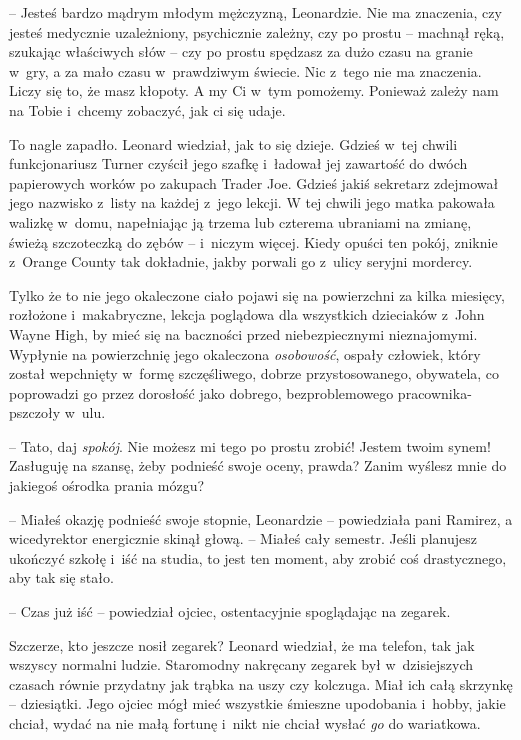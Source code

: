 \documentclass[oneside,polish,11pt,rmheadings]{mwbk}
\begin{document}
-- Jesteś bardzo mądrym młodym mężczyzną, Leonardzie. Nie ma znaczenia, czy jesteś medycznie uzależniony, psychicznie zależny, czy po prostu -- machnął ręką, szukając właściwych słów -- czy po prostu spędzasz za dużo czasu na granie w~gry, a za mało czasu w~prawdziwym świecie. Nic z~tego nie ma znaczenia. Liczy się to, że masz kłopoty. A my Ci w~tym pomożemy. Ponieważ zależy nam na Tobie i~chcemy zobaczyć, jak ci się udaje. 


To nagle zapadło. Leonard wiedział, jak to się dzieje. Gdzieś w~tej chwili funkcjonariusz Turner czyścił jego szafkę i~ładował jej zawartość do dwóch papierowych worków po zakupach Trader Joe. Gdzieś jakiś sekretarz zdejmował jego nazwisko z~listy na każdej z~jego lekcji. W tej chwili jego matka pakowała walizkę w~domu, napełniając ją trzema lub czterema ubraniami na zmianę, świeżą szczoteczką do zębów -- i~niczym więcej. Kiedy opuści ten pokój, zniknie z~Orange County tak dokładnie, jakby porwali go z~ulicy seryjni mordercy. 


Tylko że to nie jego okaleczone ciało pojawi się na powierzchni za kilka miesięcy, rozłożone i~makabryczne, lekcja poglądowa dla wszystkich dzieciaków z~John Wayne High, by mieć się na baczności przed niebezpiecznymi nieznajomymi. Wypłynie na powierzchnię jego okaleczona \textit{osobowość}, ospały człowiek, który został wepchnięty w~formę szczęśliwego, dobrze przystosowanego, obywatela, co poprowadzi go przez dorosłość jako dobrego, bezproblemowego pracownika-pszczoły w~ulu. 


-- Tato, daj \textit{spokój}. Nie możesz mi tego po prostu zrobić! Jestem twoim synem! Zasługuję na szansę, żeby podnieść swoje oceny, prawda? Zanim wyślesz mnie do jakiegoś ośrodka prania mózgu? 


-- Miałeś okazję podnieść swoje stopnie, Leonardzie -- powiedziała pani Ramirez, a wicedyrektor energicznie skinął głową. -- Miałeś cały semestr. Jeśli planujesz ukończyć szkołę i~iść na studia, to jest ten moment, aby zrobić coś drastycznego, aby tak się stało. 


-- Czas już iść -- powiedział ojciec, ostentacyjnie spoglądając na zegarek. 

Szczerze, kto jeszcze nosił zegarek? Leonard wiedział, że ma telefon, tak jak wszyscy normalni ludzie. Staromodny nakręcany zegarek był w~dzisiejszych czasach równie przydatny jak trąbka na uszy czy kolczuga. Miał ich całą skrzynkę -- dziesiątki. Jego ojciec mógł mieć wszystkie śmieszne upodobania i~hobby, jakie chciał, wydać na nie małą fortunę i~nikt nie chciał wysłać \textit{go }do wariatkowa. 
\end{document}
